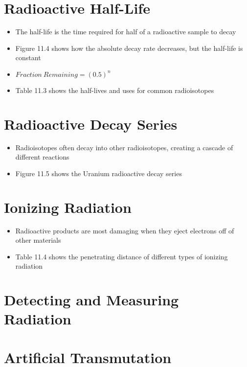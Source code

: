 \documentclass[12pt, openany, letterpaper]{memoir}
\begin{document}
\section{Radioactive Half-Life}
\begin{itemize}
	\item The half-life is the time required for half of a radioactive sample to decay
	\item Figure 11.4 shows how the absolute decay rate decreases, but the half-life is constant
	\item $Fraction~Remaining = \left(0.5\right)^{n}$
	\item Table 11.3 shows the half-lives and uses for common radioisotopes
\end{itemize}

\section*{Radioactive Decay Series}
\begin{itemize}
	\item Radioisotopes often decay into other radioisotopes, creating a cascade of different reactions
	\item Figure 11.5 shows the Uranium radioactive decay series
\end{itemize}

\section{Ionizing Radiation}
\begin{itemize}
	\item Radioactive products are most damaging when they eject electrons off of other materials
	\item Table 11.4 shows the penetrating distance of different types of ionizing radiation
\end{itemize}

\section{Detecting and Measuring Radiation}

\section{Artificial Transmutation}
\end{document}
